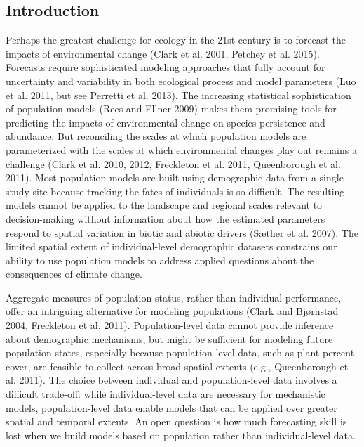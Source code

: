 \documentclass[12pt,]{article}
\begin{document}
\subsection{Introduction}\label{introduction}

Perhaps the greatest challenge for ecology in the 21st century is to
forecast the impacts of environmental change (Clark et al. 2001, Petchey
et al. 2015). Forecasts require sophisticated modeling approaches that
fully account for uncertainty and variability in both ecological process
and model parameters (Luo et al. 2011, but see Perretti et al. 2013).
The increasing statistical sophistication of population models (Rees and
Ellner 2009) makes them promising tools for predicting the impacts of
environmental change on species persistence and abundance. But
reconciling the scales at which population models are parameterized with
the scales at which environmental changes play out remains a challenge
(Clark et al. 2010, 2012, Freckleton et al. 2011, Queenborough et al.
2011). Most population models are built using demographic data from a
single study site because tracking the fates of individuals is so
difficult. The resulting models cannot be applied to the landscape and
regional scales relevant to decision-making without information about
how the estimated parameters respond to spatial variation in biotic and
abiotic drivers (S{æ}ther et al. 2007). The limited spatial extent of
individual-level demographic datasets constrains our ability to use
population models to address applied questions about the consequences of
climate change.

Aggregate measures of population status, rather than individual
performance, offer an intriguing alternative for modeling populations
(Clark and Bj{ø}rnstad 2004, Freckleton et al. 2011). Population-level
data cannot provide inference about demographic mechanisms, but might be
sufficient for modeling future population states, especially because
population-level data, such as plant percent cover, are feasible to
collect across broad spatial extents (e.g., Queenborough et al. 2011).
The choice between individual and population-level data involves a
difficult trade-off: while individual-level data are necessary for
mechanistic models, population-level data enable models that can be
applied over greater spatial and temporal extents. An open question is
how much forecasting skill is lost when we build models based on
population rather than individual-level data.
\end{document}
